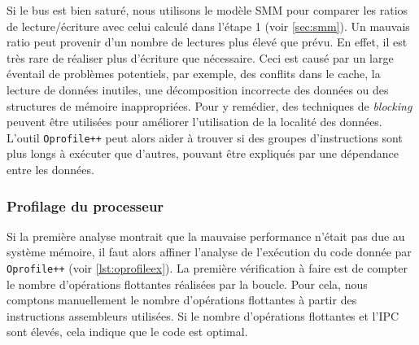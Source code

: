             Si le bus est bien saturé, nous utilisons le modèle SMM pour comparer les ratios de lecture/écriture avec celui calculé dans l'étape 1 (voir \autoref{sec:smm}). Un mauvais ratio peut provenir d'un nombre de lectures plus élevé que prévu. En effet, il est très rare de réaliser plus d'écriture que nécessaire. Ceci est causé par un large éventail de problèmes potentiels, par exemple, des conflits dans le cache, la lecture de données inutiles, une décomposition incorrecte des données ou des structures de mémoire inappropriées. Pour y remédier, des techniques de \textit{blocking} peuvent être utilisées pour améliorer l'utilisation de la localité des données.  L'outil \verb|Oprofile++| peut alors aider à trouver si des groupes d'instructions sont plus longs à exécuter que d'autres, pouvant être expliqués par une dépendance entre les données. 
        
        
        
        \subsubsection{Profilage du processeur}
        
            Si la première analyse montrait que la mauvaise performance n'était pas due au système mémoire, il faut alors affiner l'analyse de l'exécution du code donnée par \verb=Oprofile++= (voir \autoref{lst:oprofileex}).
            La première vérification à faire est de compter le nombre d'opérations flottantes réalisées par la boucle. Pour cela, nous comptons manuellement le nombre d'opérations flottantes à partir des instructions assembleurs utilisées. Si le nombre d'opérations flottantes et l'\gls{IPC} sont élevés, cela indique que le code est optimal. 
            
